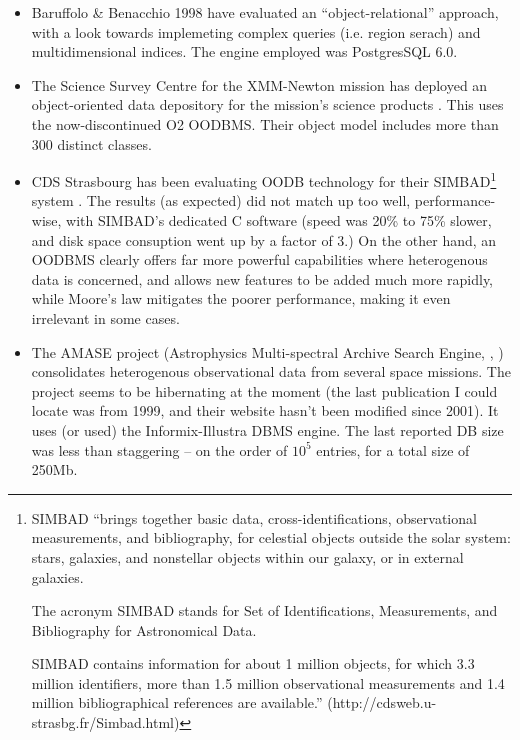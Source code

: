 \documentclass[]{lofar}
\begin{document}
  \begin{itemize} 
  
  \item Baruffolo \& Benacchio 1998 \cite{OODB3} have evaluated an
  ``object-relational'' approach, with a look towards implemeting complex queries
  (i.e. region serach) and multidimensional indices. The engine employed was
  PostgresSQL 6.0. 
  
  \item The Science Survey Centre for the XMM-Newton mission has deployed an
  object-oriented data depository for the mission's science products
  \cite{OODB1}. This uses the now-discontinued O2 OODBMS. Their object model
  includes more than 300 distinct classes. 
  
  \item CDS Strasbourg has been evaluating OODB technology for their
  SIMBAD\footnote{SIMBAD ``brings together basic data, cross-identifications,
  observational measurements, and bibliography, for celestial objects outside the
  solar system: stars, galaxies, and nonstellar objects within our galaxy, or in
  external galaxies.
  
  The acronym SIMBAD stands for Set of Identifications, Measurements, and
  Bibliography for Astronomical Data.
  
  SIMBAD contains information for about 1 million objects, for which 3.3 million
  identifiers, more than 1.5 million observational measurements and 1.4 million
  bibliographical references are available.''
  (http://cdsweb.u-strasbg.fr/Simbad.html)} system \cite{OODB2}. The results (as
  expected) did not match up too well, performance-wise, with SIMBAD's dedicated
  C software (speed was 20\% to 75\% slower, and disk space consuption went up by
  a factor of 3.) On the other hand, an OODBMS clearly offers far more powerful
  capabilities where heterogenous data is concerned, and allows new features to
  be added much more rapidly, while Moore's law mitigates the poorer performance,
  making it even irrelevant in  some cases.
  
  \item The AMASE project (Astrophysics Multi-spectral Archive Search Engine,
  \cite{AMASE}, \cite{AMASE2}) consolidates heterogenous observational data from
  several space missions. The project seems to be hibernating at the moment (the
  last publication I could locate was from 1999, and their website hasn't been
  modified since 2001). It uses (or used) the Informix-Illustra DBMS engine. The
  last reported DB size was less than staggering --  on the order of $10^5$
  entries, for a total size of 250Mb. 
  
  \end{itemize}
  
\end{document}
